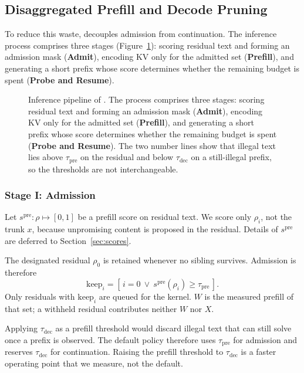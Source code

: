 \subsection{Disaggregated Prefill and Decode Pruning}
\label{sec:refuse}

To reduce this waste, \sys decouples admission from continuation.
The inference process comprises three stages (Figure~\ref{fig:arch}): scoring residual text and forming an admission mask (\textbf{Admit}), encoding KV only for the admitted set (\textbf{Prefill}), and generating a short prefix whose score determines whether the remaining budget is spent (\textbf{Probe and Resume}).

\begin{figure}[t]
\centering
\resizebox{\textwidth}{!}{}
\caption{Inference pipeline of \sys.
The process comprises three stages: scoring residual text and forming an admission mask (\textbf{Admit}), encoding KV only for the admitted set (\textbf{Prefill}), and generating a short prefix whose score determines whether the remaining budget is spent (\textbf{Probe and Resume}).
The two number lines show that illegal text lies above $\tau_{\mathrm{pre}}$ on the residual and below $\tau_{\mathrm{dec}}$ on a still-illegal prefix, so the thresholds are not interchangeable.}
\label{fig:arch}
\end{figure}

\subsubsection{Stage I: Admission}
\label{sec:prefill-admit}

Let $s^{\mathrm{pre}}:\rho\mapsto[0,1]$ be a prefill score on residual text.
We score only $\rho_i$, not the trunk $x$, because unpromising content is proposed in the residual.
Details of $s^{\mathrm{pre}}$ are deferred to Section~\ref{sec:scores}.

The designated residual $\rho_0$ is retained whenever no sibling survives.
Admission is therefore
\begin{equation}
\label{eq:keep}
\mathrm{keep}_i=[\,i=0\ \lor\ s^{\mathrm{pre}}(\rho_i)\ge\tau_{\mathrm{pre}}\,].
\end{equation}
Only residuals with $\mathrm{keep}_i$ are queued for the kernel.
$W$ is the measured prefill of that set; a withheld residual contributes neither $W$ nor $X$.

Applying $\tau_{\mathrm{dec}}$ as a prefill threshold would discard illegal text that can still solve once a prefix is observed.
The default policy therefore uses $\tau_{\mathrm{pre}}$ for admission and reserves $\tau_{\mathrm{dec}}$ for continuation.
Raising the prefill threshold to $\tau_{\mathrm{dec}}$ is a faster operating point that we measure, not the default.

